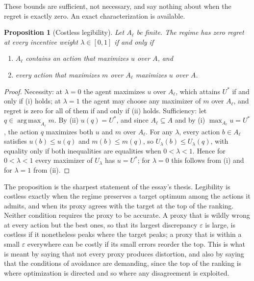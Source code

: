 \documentclass[11pt]{article}
\newtheorem{proposition}{Proposition}
\theoremstyle{remark}
\newcommand{\argmax}{\operatorname*{arg\,max}}
\begin{document}
These bounds are sufficient, not necessary, and say nothing about when the regret is exactly zero. An exact characterization is available.

\begin{proposition}[Costless legibility]
Let $A_\ell$ be finite. The regime has zero regret at every incentive weight $\lambda\in[0,1]$ if and only if
\begin{enumerate}
\item[(i)] $A_\ell$ contains an action that maximizes $u$ over $A$, and
\item[(ii)] every action that maximizes $m$ over $A_\ell$ maximizes $u$ over $A$.
\end{enumerate}
\end{proposition}

\begin{proof}
Necessity: at $\lambda=0$ the agent maximizes $u$ over $A_\ell$, which attains $U^\ast$ if and only if (i) holds; at $\lambda=1$ the agent may choose any maximizer of $m$ over $A_\ell$, and regret is zero for all of them if and only if (ii) holds. Sufficiency: let $q\in\argmax_{A_\ell}m$. By (ii) $u(q)=U^\ast$, and since $A_\ell\subseteq A$ and by (i) $\max_{A_\ell}u=U^\ast$, the action $q$ maximizes both $u$ and $m$ over $A_\ell$. For any $\lambda$, every action $b\in A_\ell$ satisfies $u(b)\le u(q)$ and $m(b)\le m(q)$, so $U_\lambda(b)\le U_\lambda(q)$, with equality only if both inequalities are equalities when $0<\lambda<1$. Hence for $0<\lambda<1$ every maximizer of $U_\lambda$ has $u=U^\ast$; for $\lambda=0$ this follows from (i) and for $\lambda=1$ from (ii).
\end{proof}

The proposition is the sharpest statement of the essay's thesis. Legibility is costless exactly when the regime preserves a target optimum among the actions it admits, and when its proxy agrees with the target at the top of the ranking. Neither condition requires the proxy to be accurate. A proxy that is wildly wrong at every action but the best ones, so that its largest discrepancy $\varepsilon$ is large, is costless if it nonetheless peaks where the target peaks; a proxy that is within a small $\varepsilon$ everywhere can be costly if its small errors reorder the top. This is what is meant by saying that not every proxy produces distortion, and also by saying that the conditions of avoidance are demanding, since the top of the ranking is where optimization is directed and so where any disagreement is exploited.
\end{document}

